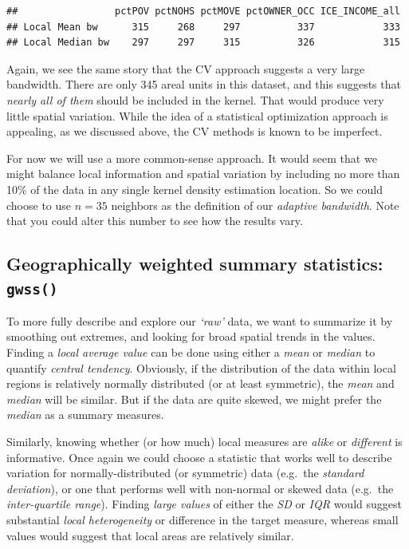 \documentclass[
]{book}
\begin{document}
\begin{verbatim}
##                 pctPOV pctNOHS pctMOVE pctOWNER_OCC ICE_INCOME_all
## Local Mean bw      315     268     297          337            333
## Local Median bw    297     297     315          326            315
\end{verbatim}

Again, we see the same story that the CV approach suggests a very large bandwidth. There are only 345 areal units in this dataset, and this suggests that \emph{nearly all of them} should be included in the kernel. That would produce very little spatial variation. While the idea of a statistical optimization approach is appealing, as we discussed above, the CV methods is known to be imperfect.

For now we will use a more common-sense approach. It would seem that we might balance local information and spatial variation by including no more than 10\% of the data in any single kernel density estimation location. So we could choose to use \(n=35\) neighbors as the definition of our \emph{adaptive bandwidth}. Note that you could alter this number to see how the results vary.

\hypertarget{geographically-weighted-summary-statistics-gwss}{%
\subsection{\texorpdfstring{Geographically weighted summary statistics: \texttt{gwss()}}{Geographically weighted summary statistics: gwss()}}\label{geographically-weighted-summary-statistics-gwss}}

To more fully describe and explore our \emph{`raw'} data, we want to summarize it by smoothing out extremes, and looking for broad spatial trends in the values. Finding a \emph{local average value} can be done using either a \emph{mean} or \emph{median} to quantify \emph{central tendency}. Obviously, if the distribution of the data within local regions is relatively normally distributed (or at least symmetric), the \emph{mean} and \emph{median} will be similar. But if the data are quite skewed, we might prefer the \emph{median} as a summary measures.

Similarly, knowing whether (or how much) local measures are \emph{alike} or \emph{different} is informative. Once again we could choose a statistic that works well to describe variation for normally-distributed (or symmetric) data (e.g.~the \emph{standard deviation}), or one that performs well with non-normal or skewed data (e.g.~the \emph{inter-quartile range}). Finding \emph{large values} of either the \emph{SD} or \emph{IQR} would suggest substantial \emph{local heterogeneity} or difference in the target measure, whereas small values would suggest that local areas are relatively similar.
\end{document}
